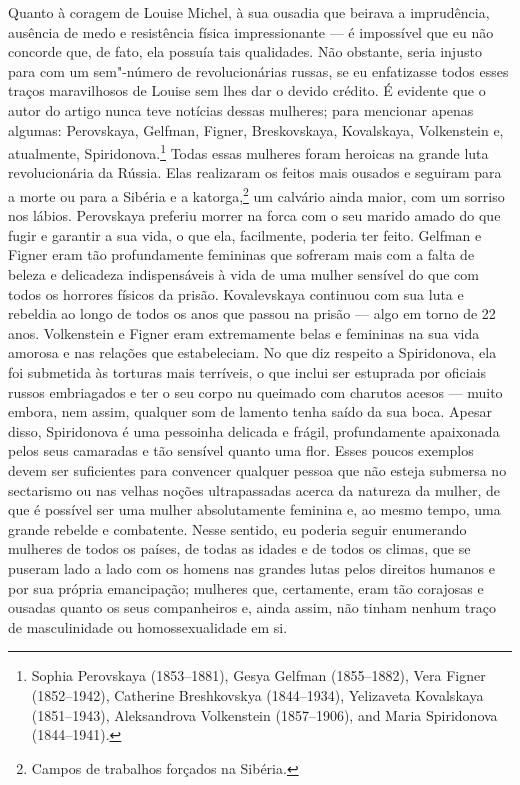 Quanto à coragem de Louise Michel, à sua ousadia que beirava a
imprudência, ausência de medo e resistência física impressionante --- é
impossível que eu não concorde que, de fato, ela possuía tais
qualidades. Não obstante, seria injusto para com um sem"-número de
revolucionárias russas, se eu enfatizasse todos esses traços
maravilhosos de Louise sem lhes dar o devido crédito. É evidente que o
autor do artigo nunca teve notícias dessas mulheres; para mencionar
apenas algumas: Perovskaya, Gelfman, Figner, Breskovskaya, Kovalskaya,
Volkenstein e, atualmente, Spiridonova.\footnote{Sophia Perovskaya (1853--1881),
  Gesya Gelfman (1855--1882), Vera Figner (1852--1942), Catherine Breshkovskya (1844--1934), Yelizaveta
  Kovalskaya (1851--1943), Aleksandrova Volkenstein (1857--1906), and Maria Spiridonova (1844--1941).} Todas essas
mulheres foram heroicas na grande luta revolucionária da Rússia. Elas
realizaram os feitos mais ousados ​​e seguiram para a morte ou para a
Sibéria e a katorga,\footnote{Campos de trabalhos forçados na Sibéria.}
um calvário ainda maior, com um sorriso nos lábios. Perovskaya preferiu
morrer na forca com o seu marido amado do que fugir e garantir a sua
vida, o que ela, facilmente, poderia ter feito. Gelfman e Figner eram
tão profundamente femininas que sofreram mais com a falta de beleza e
delicadeza indispensáveis à vida de uma mulher sensível do que com todos
os horrores físicos da prisão. Kovalevskaya continuou com sua luta e rebeldia
ao longo de todos os anos que passou na prisão --- algo em torno de 22 anos. Volkenstein e Figner eram extremamente belas e femininas na
sua vida amorosa e nas relações que estabeleciam. No que diz respeito a
Spiridonova, ela foi submetida às torturas mais terríveis, o que inclui
ser estuprada por oficiais russos embriagados e ter o seu corpo nu
queimado com charutos acesos --- muito embora, nem assim, qualquer som
de lamento tenha saído da sua boca. Apesar disso, Spiridonova é uma pessoinha delicada e
frágil, profundamente apaixonada pelos seus camaradas e tão sensível
quanto uma flor. Esses poucos exemplos devem ser suficientes para
convencer qualquer pessoa que não esteja submersa no sectarismo ou nas
velhas noções ultrapassadas acerca da natureza da mulher, de que é possível ser
uma mulher absolutamente feminina e, ao mesmo tempo, uma grande rebelde
e combatente. Nesse sentido, eu poderia seguir enumerando mulheres de
todos os países, de todas as idades e de todos os climas, que se puseram
lado a lado com os homens nas grandes lutas pelos direitos humanos e
por sua própria emancipação; mulheres que, certamente, eram tão corajosas e
ousadas quanto os seus companheiros e, ainda assim, não tinham nenhum
traço de masculinidade ou homossexualidade em si.

